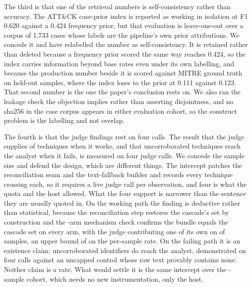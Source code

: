 The third is that one of the retrieval numbers is self-consistency rather than accuracy. The ATT\&CK
case-prior index is reported as working in isolation at F1 0.620 against a 0.424 frequency prior,
but that evaluation is leave-one-out over a corpus of 1,733 cases whose labels are the pipeline's
own prior attributions. We concede it and have relabelled the number as self-consistency. It is
retained rather than deleted because a frequency prior scored the same way reaches 0.424, so the
index carries information beyond base rates even under its own labelling, and because the production
number beside it is scored against MITRE ground truth on held-out samples, where the index loses to
the prior at 0.111 against 0.123. That second number is the one the paper's conclusion rests on. We
also ran the leakage check the objection implies rather than asserting disjointness, and no sha256
in the case corpus appears in either evaluation cohort, so the construct problem is the labelling
and not overlap.

The fourth is that the judge findings rest on four calls. The result that the judge supplies
 of  techniques when it works, and that
 uncorroborated techniques reach the analyst when it fails, is measured on
four judge calls. We concede the sample size and defend the design, which are different things. The
intercept patches the reconciliation seam and the text-fallback builder and records every technique
crossing each, so it requires a live judge call per observation, and four is what the quota and the
host allowed. What the four support is narrower than the sentence they are usually quoted in. On the
working path the finding is deductive rather than statistical, because the reconciliation step
restores the cascade's set by construction and the -arm mechanism check
confirms the bundle equals the cascade set on every arm, with the judge contributing one of its own
on  of  samples, an upper bound of
 on the per-sample rate. On the failing path it is an existence
claim: uncorroborated identifiers do reach the analyst, demonstrated on four calls against an
uncapped control whose raw text provably contains none. Neither claim is a rate. What would settle
it is the same intercept over the -sample cohort, which needs no new
instrumentation, only the host.

